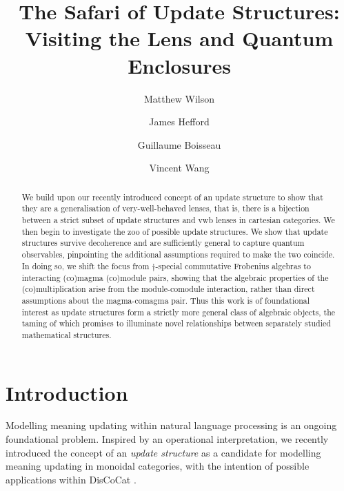 \documentclass[submission,copyright,creativecommons,sharealike,noncommercial]{eptcs}
\theoremstyle{definition}
\theoremstyle{plain}
\theoremstyle{plain}
\begin{document}
\title{The Safari of Update Structures: Visiting the Lens and Quantum Enclosures}

\author{Matthew Wilson   \and
James Hefford   \and Guillaume Boisseau   \and 
Vincent Wang   }

\def\titlerunning{The Safari of Update Structures}
\def\authorrunning{M. Wilson, J. Hefford, G. Boisseau and V. Wang}

\maketitle

\begin{abstract}
    We build upon our recently introduced concept of an update structure to show that they are a generalisation of very-well-behaved lenses, that is, there is a bijection between a strict subset of update structures and vwb lenses in cartesian categories. We then begin to investigate the zoo of possible update structures. We show that update structures survive decoherence and are sufficiently general to capture quantum observables, pinpointing the additional assumptions required to make the two coincide. In doing so, we shift the focus from $\dag$-special commutative Frobenius algebras to interacting (co)magma (co)module pairs, showing that the algebraic properties of the (co)multiplication arise from the module-comodule interaction, rather than direct assumptions about the magma-comagma pair. Thus this work is of foundational interest as update structures form a strictly more general class of algebraic objects, the taming of which promises to illuminate novel relationships between separately studied mathematical structures.
\end{abstract}

\section{Introduction}
Modelling meaning updating within natural language processing is an ongoing foundational problem. Inspired by an operational interpretation, we recently introduced the concept of an \textit{update structure} \cite{hefford2020categories} as a candidate for modelling meaning updating in monoidal categories, with the intention of possible applications within DisCoCat \cite{coecke_mathematics_2019, coecke_mathematical_meaning,coecke2020meaning}.
\end{document}

